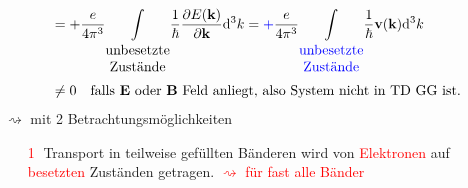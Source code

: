 \begin{itemize}
\begin{align}
             &= + \frac{e}{4 \pi^3} \underset{\begin{matrix}
                \text{unbesetzte}\\
                \text{Zustände}
            \end{matrix}}{\int} \frac{1}{\hbar} \frac{\partial E(\textbf{k})}{\partial \textbf{k}} \mathrm{d}^3 k = \textcolor{blue}{+} \frac{e}{4 \pi^3} \underset{\begin{matrix}
                \text{\textcolor{blue}{unbesetzte}}\\
                \text{\textcolor{blue}{Zustände}}
            \end{matrix}}{\int} \frac{1}{\hbar} \textbf{v}(\textbf{k}) \mathrm{d}^3 k\\
            &\neq 0 \quad \text{falls } \textbf{E} \text{ oder } \textbf{B} \text{ Feld anliegt, also System nicht in TD GG ist.}
        \end{align}
        $\rightsquigarrow$  mit 2 Betrachtungsmöglichkeiten
        \begin{itemize}
            \item[\textcolor{red}{\textcircled{1}}] Transport in teilweise gefüllten Bänderen wird von \textcolor{red}{Elektronen} auf \textcolor{red}{besetzten} Zuständen getragen. \textcolor{red}{$\rightsquigarrow$ für fast alle Bänder}
            

\end{itemize}
\end{itemize}
